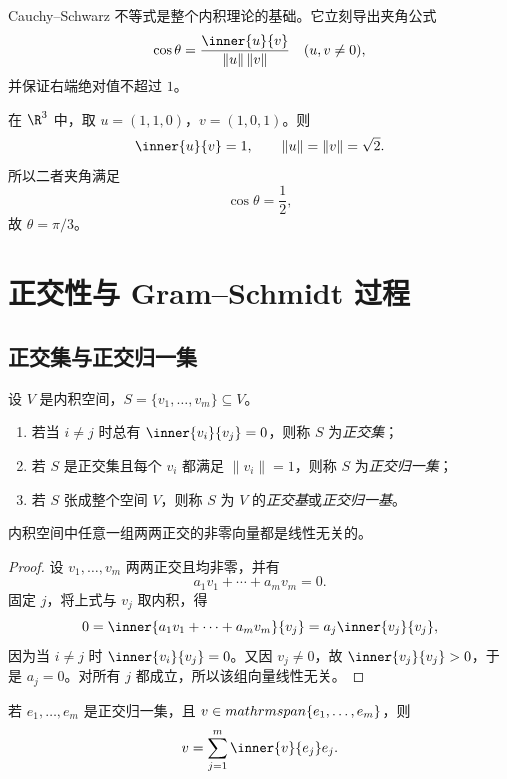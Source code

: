 \begin{remark}
Cauchy--Schwarz 不等式是整个内积理论的基础。它立刻导出夹角公式
\[
\cos\theta=\frac{\inner{u}{v}}{\|u\|\,\|v\|}
\quad (u,v\ne 0),
\]
并保证右端绝对值不超过 $1$。
\end{remark}

\begin{example}
在 $\R^3$ 中，取 $u=(1,1,0)$，$v=(1,0,1)$。则
\[
\inner{u}{v}=1,\qquad \|u\|=\|v\|=\sqrt{2}.
\]
所以二者夹角满足
\[
\cos\theta=\frac{1}{2},
\]
故 $\theta=\pi/3$。
\end{example}

\section{正交性与 Gram--Schmidt 过程}

\subsection{正交集与正交归一集}

\begin{definition}
设 $V$ 是内积空间，$S=\{v_1,\dots,v_m\}\subseteq V$。
\begin{enumerate}[label=\textnormal{(\arabic*)}]
  \item 若当 $i\ne j$ 时总有 $\inner{v_i}{v_j}=0$，则称 $S$ 为\emph{正交集}；
  \item 若 $S$ 是正交集且每个 $v_i$ 都满足 $\|v_i\|=1$，则称 $S$ 为\emph{正交归一集}；
  \item 若 $S$ 张成整个空间 $V$，则称 $S$ 为 $V$ 的\emph{正交基}或\emph{正交归一基}。
\end{enumerate}
\end{definition}

\begin{proposition}
内积空间中任意一组两两正交的非零向量都是线性无关的。
\end{proposition}

\begin{proof}
设 $v_1,\dots,v_m$ 两两正交且均非零，并有
\[
a_1v_1+\cdots+a_mv_m=0.
\]
固定 $j$，将上式与 $v_j$ 取内积，得
\[
0=\inner{a_1v_1+\cdots+a_mv_m}{v_j}=a_j\inner{v_j}{v_j},
\]
因为当 $i\ne j$ 时 $\inner{v_i}{v_j}=0$。又因 $v_j\ne 0$，故 $\inner{v_j}{v_j}>0$，于是 $a_j=0$。对所有 $j$ 都成立，所以该组向量线性无关。
\end{proof}

\begin{proposition}
若 $e_1,\dots,e_m$ 是正交归一集，且 $v\in \\mathrm{span}\{e_1,\dots,e_m\}$，则
\[
v=\sum_{j=1}^m \inner{v}{e_j}e_j.
\]
\end{proposition}

